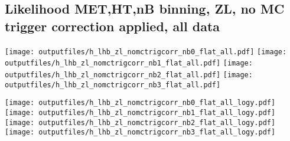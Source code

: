 \documentclass[11pt]{article}
\begin{document}






    \subsection{ Likelihood MET,HT,nB binning, ZL, no MC trigger correction applied, all data}

    \noindent
     \texttt{[image: outputfiles/h\_lhb\_zl\_nomctrigcorr\_nb0\_flat\_all.pdf]}
     \texttt{[image: outputfiles/h\_lhb\_zl\_nomctrigcorr\_nb1\_flat\_all.pdf]}
     \texttt{[image: outputfiles/h\_lhb\_zl\_nomctrigcorr\_nb2\_flat\_all.pdf]}
     \texttt{[image: outputfiles/h\_lhb\_zl\_nomctrigcorr\_nb3\_flat\_all.pdf]}

    \noindent
     \texttt{[image: outputfiles/h\_lhb\_zl\_nomctrigcorr\_nb0\_flat\_all\_logy.pdf]}
     \texttt{[image: outputfiles/h\_lhb\_zl\_nomctrigcorr\_nb1\_flat\_all\_logy.pdf]}
     \texttt{[image: outputfiles/h\_lhb\_zl\_nomctrigcorr\_nb2\_flat\_all\_logy.pdf]}
     \texttt{[image: outputfiles/h\_lhb\_zl\_nomctrigcorr\_nb3\_flat\_all\_logy.pdf]}
\end{document}
